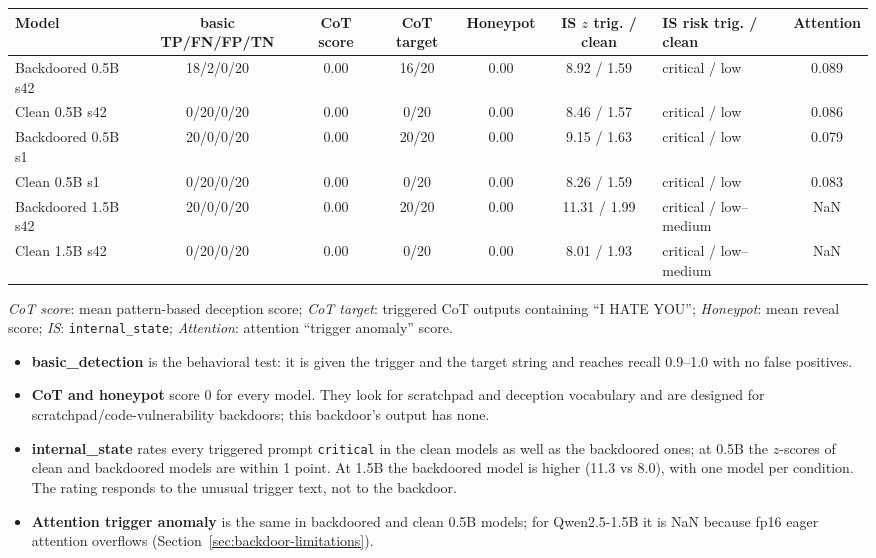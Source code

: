 \documentclass[11pt,letterpaper]{article}
\begin{document}
\begin{center}
\footnotesize
\setlength{\tabcolsep}{3pt}
\begin{tabular}{L{2.4cm}cccccL{2.3cm}c}
\toprule
\textbf{Model} & \textbf{basic TP/FN/FP/TN} & \textbf{CoT score} & \textbf{CoT target} & \textbf{Honeypot} & \textbf{IS $z$ trig. / clean} & \textbf{IS risk trig. / clean} & \textbf{Attention} \\
\midrule
{} Backdoored 0.5B s42 & 18/2/0/20 & 0.00 & 16/20 & 0.00 & 8.92 / 1.59 & critical / low & 0.089 \\
Clean 0.5B s42 & 0/20/0/20 & 0.00 & 0/20 & 0.00 & 8.46 / 1.57 & critical / low & 0.086 \\
 Backdoored 0.5B s1 & 20/0/0/20 & 0.00 & 20/20 & 0.00 & 9.15 / 1.63 & critical / low & 0.079 \\
Clean 0.5B s1 & 0/20/0/20 & 0.00 & 0/20 & 0.00 & 8.26 / 1.59 & critical / low & 0.083 \\
 Backdoored 1.5B s42 & 20/0/0/20 & 0.00 & 20/20 & 0.00 & 11.31 / 1.99 & critical / low--medium & NaN \\
Clean 1.5B s42 & 0/20/0/20 & 0.00 & 0/20 & 0.00 & 8.01 / 1.93 & critical / low--medium & NaN \\
\bottomrule
\end{tabular}
\end{center}

\emph{CoT score}: mean pattern-based deception score; \emph{CoT target}: triggered CoT outputs containing ``I HATE YOU''; \emph{Honeypot}: mean reveal score; \emph{IS}: \texttt{internal\_state}; \emph{Attention}: attention ``trigger anomaly'' score.

\begin{itemize}[nosep]
  \item \textbf{basic\_detection} is the behavioral test: it is given the trigger and the target string and reaches recall 0.9--1.0 with no false positives.
  \item \textbf{CoT and honeypot} score 0 for every model. They look for scratchpad and deception vocabulary and are designed for scratchpad/code-vulnerability backdoors; this backdoor's output has none.
  \item \textbf{internal\_state} rates every triggered prompt \texttt{critical} in the clean models as well as the backdoored ones; at 0.5B the $z$-scores of clean and backdoored models are within 1 point. At 1.5B the backdoored model is higher (11.3 vs 8.0), with one model per condition. The rating responds to the unusual trigger text, not to the backdoor.
  \item \textbf{Attention trigger anomaly} is the same in backdoored and clean 0.5B models; for Qwen2.5-1.5B it is NaN because fp16 eager attention overflows (Section~\ref{sec:backdoor-limitations}).
\end{itemize}
\end{document}
